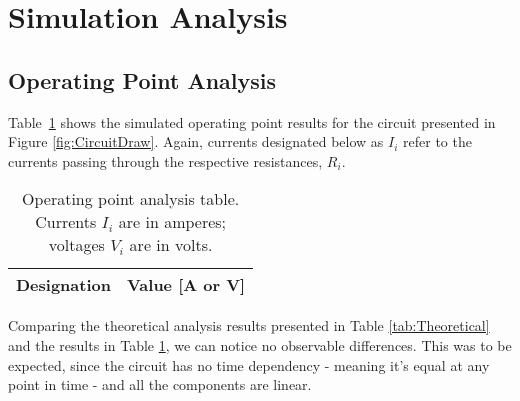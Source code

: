 \section{Simulation Analysis}
\label{sec:simulation}

\subsection{Operating Point Analysis}

Table~\ref{tab:op} shows the simulated operating point results for the circuit presented in Figure \ref{fig:CircuitDraw}. Again, currents designated below as $I_i$ refer to the currents passing through the respective resistances, $R_i$.

\begin{table}[H]
  \centering
  \begin{tabular}{|c|c|}
    \hline    
    {\bf Designation} & {\bf Value [A or V]} \\ \hline
    
  \end{tabular}
  \caption{Operating point analysis table. Currents $I_i$ are in amperes; voltages $V_i$ are in volts.}
  \label{tab:op}
\end{table}

Comparing the theoretical analysis results presented in Table \ref{tab:Theoretical} and the results in Table \ref{tab:op}, we can notice no observable differences. This was to be expected, since the circuit has no time dependency - meaning it's equal at any point in time - and all the components are linear.

